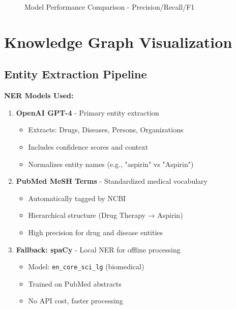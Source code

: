 \begin{figure}[h]
\centering
{}
\caption{Model Performance Comparison - Precision/Recall/F1}
\label{fig:model-comparison}
\end{figure}

\section{Knowledge Graph Visualization}

\subsection{Entity Extraction Pipeline}

\textbf{NER Models Used:}
\begin{enumerate}
    \item \textbf{OpenAI GPT-4} - Primary entity extraction
    \begin{itemize}
        \item Extracts: Drugs, Diseases, Persons, Organizations
        \item Includes confidence scores and context
        \item Normalizes entity names (e.g., "aspirin" vs "Aspirin")
    \end{itemize}
    
    \item \textbf{PubMed MeSH Terms} - Standardized medical vocabulary
    \begin{itemize}
        \item Automatically tagged by NCBI
        \item Hierarchical structure (Drug Therapy → Aspirin)
        \item High precision for drug and disease entities
    \end{itemize}
    
    \item \textbf{Fallback: spaCy} - Local NER for offline processing
    \begin{itemize}
        \item Model: \texttt{en\_core\_sci\_lg} (biomedical)
        \item Trained on PubMed abstracts
        \item No API cost, faster processing
    \end{itemize}
\end{enumerate}

